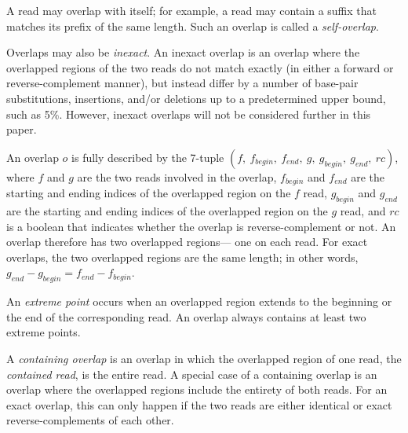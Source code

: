 \documentclass[10pt]{article}
\newcommand{\KeyTerm}[1]{{\it #1}}
\begin{document}
A read may overlap with itself; for example, a read may contain a suffix that
matches its prefix of the same length.  Such an overlap is called a
\KeyTerm{self-overlap}.

Overlaps may also be \KeyTerm{inexact}.  An inexact overlap is an overlap where
the overlapped regions of the two reads do not match exactly (in either a
forward or reverse-complement manner), but instead differ by a number of
base-pair substitutions, insertions, and/or deletions up to a predetermined
upper bound, such as 5\%.  However, inexact overlaps will not be considered
further in this paper.

An overlap $o$ is fully described by the 7-tuple $(f,\ f_{begin},\ f_{end},\ g,
\ g_{begin},\ g_{end},\ rc)$, where $f$ and $g$ are the two reads involved in the
overlap, $f_{begin}$ and $f_{end}$ are the starting and ending indices of the
overlapped region on the $f$ read, $g_{begin}$ and $g_{end}$ are the starting
and ending indices of the overlapped region on the $g$ read, and $rc$ is a
boolean that indicates whether the overlap is reverse-complement or not.  An
overlap therefore has two overlapped regions--- one on each read.  For exact
overlaps, the two overlapped regions are the same length; in other words,
$g_{end} - g_{begin} = f_{end} - f_{begin}$.

An \KeyTerm{extreme point} occurs when an overlapped region extends to the
beginning or the end of the corresponding read.  An overlap always contains at
least two extreme points.

A \KeyTerm{containing overlap} is an overlap in which the overlapped region of
one read, the \KeyTerm{contained read}, is the entire read.  A special case of a
containing overlap is an overlap where the overlapped regions include the
entirety of both reads.  For an exact overlap, this can only happen if the two
reads are either identical or exact reverse-complements of each other.
\end{document}
